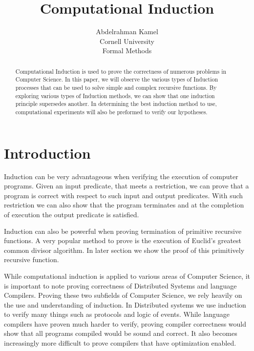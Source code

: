 \documentclass{article}
\begin{document}
\title{Computational Induction}
\author{Abdelrahman Kamel \\ Cornell University \\ Formal Methods}
\maketitle

\begin{abstract}
Computational Induction is used to prove the correctness of numerous problems in Computer Science. In this paper, we will observe the various types of Induction processes that can be used to solve simple and complex recursive functions. By exploring various types of Induction methods, we can show that one induction principle supersedes another. In determining the best induction method to use, computational experiments will also be preformed to verify our hypotheses. 
\end{abstract}


\section{Introduction}

Induction can be very advantageous when verifying the execution of computer programs. Given an input predicate, that meets a restriction, we can prove that a program is correct with respect to such input and output predicates. With such restriction we can also show that the program terminates and at the completion of execution the output predicate is satisfied. 

Induction can also be powerful when proving termination of primitive recursive functions. A very popular method to prove is the execution of Euclid's greatest common divisor algorithm. In later section we show the proof of this primitively recursive function. 

While computational induction is applied to various areas of Computer Science, it is important to note proving correctness of Distributed Systems and language Compilers. Proving these two subfields of Computer Science, we rely heavily on the use and understanding of induction. In Distributed systems we use induction to verify many things such as protocols and logic of events. While language compilers have proven much harder to verify, proving compiler correctness would show that all programs compiled would be sound and correct. It also becomes increasingly more difficult to prove compilers that have optimization enabled. 
\end{document}
